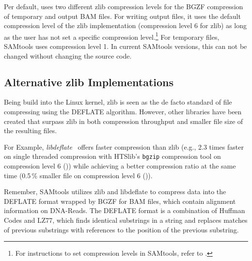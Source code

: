 Per default, \sort uses two different zlib compression levels for the BGZF compression of temporary and output BAM files. For writing output files, it uses the default compression level of the zlib implementation (compression level 6 for zlib) as long as the user has not set a specific compression level.\footnote{For instructions to set compression levels in SAMtools, refer to .} For temporary files, SAMtools uses compression level 1. In current SAMtools versions, this can not be changed without changing the source code.


\subsection{Alternative zlib Implementations}\label{altZlibs}
Being build into the Linux kernel, zlib is seen as the de facto standard of file compressing using the DEFLATE algorithm. However, other libraries have been created that surpass zlib in both compression throughput and smaller file size of the resulting files.

For Example, \textit{libdeflate}~\cite{biggers_ebiggerslibdeflate_2024} offers faster compression than zlib (e.g., 2.3 times faster on single threaded compression with HTSlib's \texttt{bgzip} compression tool on compression level 6 ()) while achieving a better compression ratio at the same time (0.5\,\% smaller file on compression level 6 ()).

Remember, SAMtools utilizes zlib and libdeflate to compress data into the DEFLATE format wrapped by BGZF for BAM files, which contain alignment information on DNA-Reads. The DEFLATE format is a combination of Huffman Codes and LZ77, which finds identical substrings in a string and replaces matches of previous substrings with references to the position of the previous substring.

